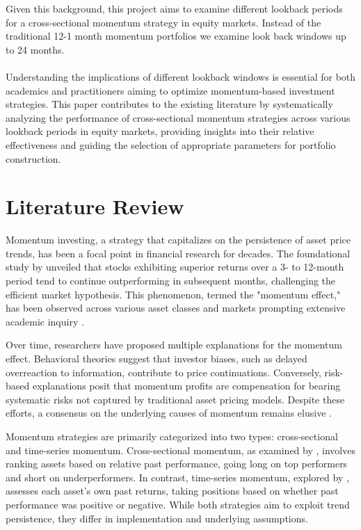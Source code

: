 \documentclass[a4paper,12pt,twoside]{article}
\begin{document}
Given this background, this project aims to examine different lookback periods for a cross-sectional momentum strategy in equity markets. Instead of the traditional 12-1 month momentum portfolios we examine look back windows up to 24 months.
\\~\\
Understanding the implications of different lookback windows is essential for both academics and practitioners aiming to optimize momentum-based investment strategies. This paper contributes to the existing literature by systematically analyzing the performance of cross-sectional momentum strategies across various lookback periods in equity markets, providing insights into their relative effectiveness and guiding the selection of appropriate parameters for portfolio construction.
\newpage
\section{Literature Review}
Momentum investing, a strategy that capitalizes on the persistence of asset price trends, has been a focal point in financial research for decades. The foundational study by \cite{jegadeesh1993returns} unveiled that stocks exhibiting superior returns over a 3- to 12-month period tend to continue outperforming in subsequent months, challenging the efficient market hypothesis. This phenomenon, termed the "momentum effect," has been observed across various asset classes and markets prompting extensive academic inquiry \citep{asness2013value, baltas2013momentum}.

Over time, researchers have proposed multiple explanations for the momentum effect. Behavioral theories suggest that investor biases, such as delayed overreaction to information, contribute to price continuations. Conversely, risk-based explanations posit that momentum profits are compensation for bearing systematic risks not captured by traditional asset pricing models. Despite these efforts, a consensus on the underlying causes of momentum remains elusive \citep{barberis1998model, grinblatt2005prospect, bikhchandani1992theory}.

Momentum strategies are primarily categorized into two types: cross-sectional and time-series momentum. Cross-sectional momentum, as examined by \cite{jegadeesh1993returns}, involves ranking assets based on relative past performance, going long on top performers and short on underperformers. In contrast, time-series momentum, explored by \cite{moskowitz2012time}, assesses each asset's own past returns, taking positions based on whether past performance was positive or negative. While both strategies aim to exploit trend persistence, they differ in implementation and underlying assumptions.
\end{document}
